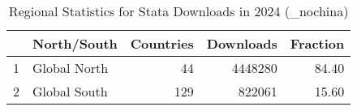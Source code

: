 \begin{table}[ht]
\centering
\begin{tabular}{rlrrr}
  \hline
 & North/South & Countries & Downloads & Fraction \\ 
  \hline
1 & Global North &  44 & 4448280 & 84.40 \\ 
  2 & Global South & 129 & 822061 & 15.60 \\ 
   \hline
\end{tabular}
\caption{Regional Statistics for Stata Downloads in 2024 (_nochina)} 
\label{tab:stata_downloads_global_stats_2024_nochina}
\end{table}
